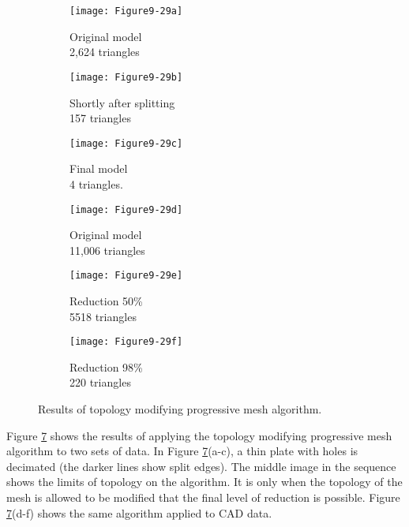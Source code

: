 \begin{description}[leftmargin=0cm,labelindent=0cm]
\begin{figure}[htb]
    \centering
	\begin{subfigure}[h]{0.32\linewidth}
		\texttt{[image: Figure9-29a]}
		\captionsetup{justification=centering}
		\caption{Original model \\ 2,624 triangles}
		\label{fig:Figure9-29a}
	\end{subfigure}
	\hfill
	\begin{subfigure}[h]{0.32\linewidth}
		\texttt{[image: Figure9-29b]}
		\captionsetup{justification=centering}
		\caption{Shortly after splitting \\ 157 triangles}
		\label{fig:Figure9-29b}
	\end{subfigure}
	\hfill
	\begin{subfigure}[h]{0.32\linewidth}
		\texttt{[image: Figure9-29c]}
		\captionsetup{justification=centering}
        \caption{Final model \\ 4 triangles.}
		\label{fig:Figure9-29c}
	\end{subfigure}
	\hfill
	\begin{subfigure}[h]{0.32\linewidth}
		\texttt{[image: Figure9-29d]}
		\captionsetup{justification=centering}
		\caption{Original model \\ 11,006 triangles}
		\label{fig:Figure9-29d}
	\end{subfigure}
	\hfill
	\begin{subfigure}[h]{0.32\linewidth}
		\texttt{[image: Figure9-29e]}
		\captionsetup{justification=centering}
		\caption{Reduction 50\% \\ 5518 triangles}
		\label{fig:Figure9-29e}
	\end{subfigure}
	\hfill
	\begin{subfigure}[h]{0.32\linewidth}
		\texttt{[image: Figure9-29f]}
		\captionsetup{justification=centering}
        \caption{Reduction 98\% \\ 220 triangles}
		\label{fig:Figure9-29f}
	\end{subfigure}
	\caption{ Results of topology modifying progressive mesh algorithm.}\label{fig:Figure9-29}
\end{figure}

Figure \ref{fig:Figure9-29} shows the results of applying the topology modifying progressive mesh algorithm to two sets of data. In Figure \ref{fig:Figure9-29}(a-c), a thin plate with holes is decimated (the darker lines show split edges). The middle image in the sequence shows the limits of topology on the algorithm. It is only when the topology of the mesh is allowed to be modified that the final level of reduction is possible. Figure \ref{fig:Figure9-29}(d-f) shows the same algorithm applied to CAD data.

\end{description}

